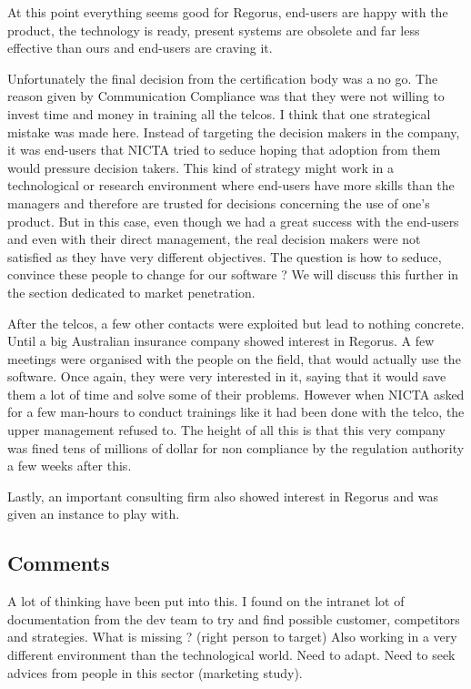 \documentclass[10pt]{report}
\begin{document}
At this point everything seems good for Regorus, end-users are happy with the product, the technology is ready, present systems are obsolete and far less effective than ours and end-users are craving it.

Unfortunately the final decision from the certification body was a no go. The reason given by Communication Compliance was that they were not willing to invest time and money in training all the telcos. I think that one strategical mistake was made here. Instead of targeting the decision makers in the company, it was end-users that NICTA tried to seduce hoping that adoption from them would pressure decision takers. This kind of strategy might work in a technological or research environment where end-users have more skills than the managers and therefore are trusted for decisions concerning the use of one's product. But in this case, even though we had a great success with the end-users and even with their direct management, the real decision makers were not satisfied as they have very different objectives. The question is how to seduce, convince these people to change for our software ? We will discuss this further in the section dedicated to market penetration.

After the telcos, a few other contacts were exploited but lead to nothing concrete. Until a big Australian insurance company showed interest in Regorus. A few meetings were organised with the people on the field, that would actually use the software. Once again, they were very interested in it, saying that it would save them a lot of time and solve some of their problems. However when NICTA asked for a few man-hours to conduct trainings like it had been done with the telco, the upper management refused to. The height of all this is that this very company was fined tens of millions of dollar for non compliance by the regulation authority a few weeks after this.

Lastly, an important consulting firm also showed interest in Regorus and was given an instance to play with. 

\subsection{Comments}
A lot of thinking have been put into this. I found on the intranet lot of documentation from the dev team to try and find possible customer, competitors and strategies. What is missing ? (right person to target) Also working in a very different environment than the technological world. Need to adapt. Need to seek advices from people in this sector (marketing study).
\end{document}
